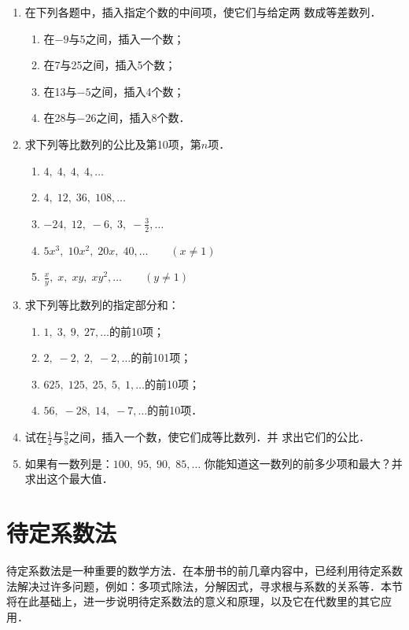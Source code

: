 \begin{enumerate}
\item  在下列各题中，插入指定个数的中间项，使它们与给定两
数成等差数列．
\begin{enumerate}
    \item 在$-9$与5之间，插入一个数；
    \item 在7与25之间，插入5个数；
    \item 在13与$-5$之间，插入4个数；
    \item 在28与$-26$之间，插入8个数．
\end{enumerate}

\item  求下列等比数列的公比及第10项，第$n$项．
\begin{enumerate}
    \item $4,\; 4,\; 4,\; 4,\ldots$
    \item $4,\; 12,\; 36,\; 108, \ldots$
    \item $-24,\; 12,\; -6,\; 3,\; -\frac{3}{2},\ldots$
    \item $5x^3,\; 10x^2,\; 20x,\; 40, \ldots \qquad  (x\ne 1)$
    \item $\frac{x}{y},\; x,\; xy,\; xy^2,\ldots\qquad (y\ne 1)$
\end{enumerate}

\item  求下列等比数列的指定部分和：
\begin{enumerate}
\item $1,\; 3,\; 9,\; 27,\ldots$的前10项；
\item $2,\; -2,\; 2,\;-2,\ldots$的前101项；
\item $625,\; 125,\; 25,\; 5,\; 1,\ldots$的前10项；
\item $56,\;-28,\; 14,\;-7,\ldots$的前10项．
\end{enumerate}

\item  试在$\frac{1}{2}$与$\frac{9}{8}$之间，插入一个数，使它们成等比数列．并
求出它们的公比．

\item 如果有一数列是：$100,\; 95,\; 90,\; 85,\ldots$
你能知道这一数列的前多少项和最大？并求出这个最大值．

\end{enumerate}

\section{待定系数法}
待定系数法是一种重要的数学方法．在本册书的前几章内容中，已经利用待定系数法解决过许多问题，例如：多项式除法，分解因式，寻求根与系数的关系等．本节将在此基础上，进一步说明待定系数法的意义和原理，以及它在代数里的其它应用．

